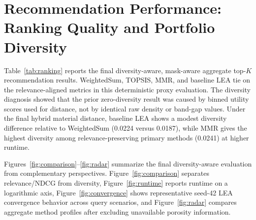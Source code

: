 \documentclass[12pt,a4paper]{article}
\begin{document}
\section{Recommendation Performance: Ranking Quality and Portfolio Diversity}
\label{sec:results}

Table~\ref{tab:ranking} reports the final diversity-aware, mask-aware aggregate top-$K$ recommendation results. WeightedSum, TOPSIS, MMR, and baseline LEA tie on the relevance-aligned metrics in this deterministic proxy evaluation. The diversity diagnosis showed that the prior zero-diversity result was caused by binned utility scores used for distance, not by identical raw density or band-gap values. Under the final hybrid material distance, baseline LEA shows a modest diversity difference relative to WeightedSum (0.0224 versus 0.0187), while MMR gives the highest diversity among relevance-preserving primary methods (0.0241) at higher runtime.

Figures~\ref{fig:comparison}--\ref{fig:radar} summarize the final diversity-aware evaluation from complementary perspectives. Figure~\ref{fig:comparison} separates relevance/NDCG from diversity, Figure~\ref{fig:runtime} reports runtime on a logarithmic axis, Figure~\ref{fig:convergence} shows representative seed-42 LEA convergence behavior across query scenarios, and Figure~\ref{fig:radar} compares aggregate method profiles after excluding unavailable porosity information.
\end{document}
